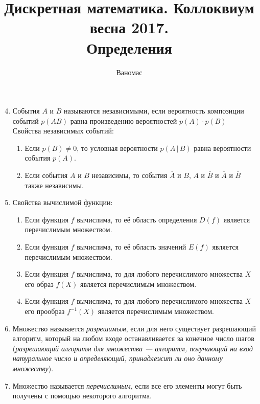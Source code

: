 \documentclass[a4paper,12pt]{article}
\begin{document}
	\title{Дискретная математика. Коллоквиум весна 2017.\\ Определения}
	\author{Ваномас}
	\maketitle
	
	\begin{enumerate}
	    \setcounter{enumi}{3}
	    \item
	    События $A$ и $B$ называются независимыми, если вероятность композиции событий $p(AB)$ равна произведению вероятностей $p(A)\cdot p(B)$
	    \medskip\\
	    Свойства независимых событий: \begin{enumerate}
	        \item Если $p(B)\ne0$, то условная вероятности $p(A\,|\,B)$ равна вероятности события $p(A)$.
	        \item Если события $A$ и $B$ независимы, то события $\overline{A}$ и $B$, $A$ и $\overline{B}$ и $\overline{A}$ и $\overline{B}$ также независимы.
	    \end{enumerate}
	    \setcounter{enumi}{17}
		\item
		Свойства вычислимой функции:
		\begin{enumerate}
		    \item Если функция $f$ вычислима, то её область определения $D(f)$ является перечислимым множеством.
		    \item Если функция $f$ вычислима, то её область значений $E(f)$ является перечислимым множеством.
		    \item Если функция $f$ вычислима, то для любого перечислимого множества $X$ его образ $f(X)$ является перечислимым множеством.
		    \item Если функция $f$ вычислима, то для любого перечислимого множества $X$ его прообраз $f^{-1}(X)$ является перечислимым множеством.
		\end{enumerate}
		\item
		Множество называется \textit{разрешимым}, если для него существует разрешающий алгоритм, который на любом входе останавливается за конечное число шагов ({\itshape разрешающий алгоритм для множества --- алгоритм, получающий на вход натуральное число и определяющий, принадлежит ли оно данному множеству}).
		\item
		Множество называется \textit{перечислимым}, если все его элементы могут быть получены с помощью некоторого алгоритма.

\end{enumerate}
\end{document}
